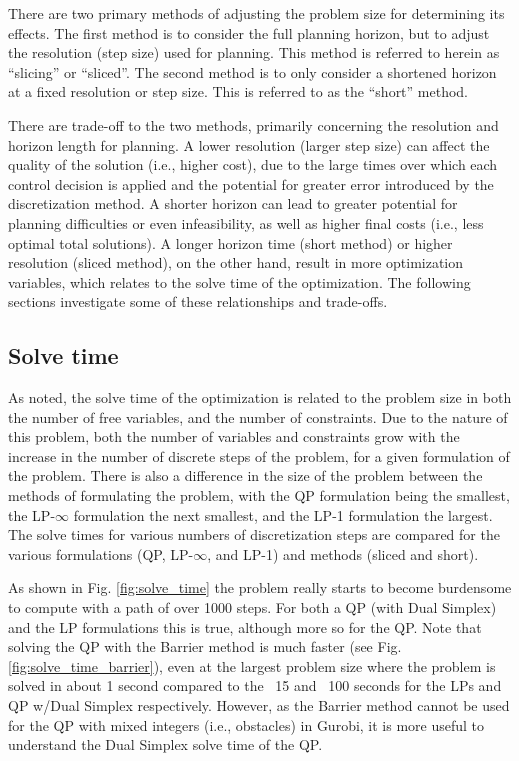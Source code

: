 There are two primary methods of adjusting the problem size for determining its effects. The first method is to consider the full planning horizon, but to adjust the resolution (step size) used for planning. This method is referred to herein as ``slicing'' or ``sliced''. The second method is to only consider a shortened horizon at a fixed resolution or step size. This is referred to as the ``short'' method.

There are trade-off to the two methods, primarily concerning the resolution and horizon length for planning. A lower resolution (larger step size) can affect the quality of the solution (i.e., higher cost), due to the large times over which each control decision is applied and the potential for greater error introduced by the discretization method. A shorter horizon can lead to greater potential for planning difficulties or even infeasibility, as well as higher final costs (i.e., less optimal total solutions). A longer horizon time (short method) or higher resolution (sliced method), on the other hand, result in more optimization variables, which relates to the solve time of the optimization. The following sections investigate some of these relationships and trade-offs.

\subsection{Solve time} \label{ssec:solve_time}
As noted, the solve time of the optimization is related to the problem size in both the number of free variables, and the number of constraints. Due to the nature of this problem, both the number of variables and constraints grow with the increase in the number of discrete steps of the problem, for a given formulation of the problem. There is also a difference in the size of the problem between the methods of formulating the problem, with the QP formulation being the smallest, the LP-$\infty$ formulation the next smallest, and the LP-1 formulation the largest. The solve times for various numbers of discretization steps are compared for the various formulations (QP, LP-$\infty$, and LP-1) and methods (sliced and short).

As shown in Fig. \ref{fig:solve_time} the problem really starts to become burdensome to compute with a path of over 1000 steps. For both a QP (with Dual Simplex) and the LP formulations this is true, although more so for the QP. Note that solving the QP with the Barrier method is much faster (see Fig. \ref{fig:solve_time_barrier}), even at the largest problem size where the problem is solved in about 1 second compared to the ~15 and ~100 seconds for the LPs and QP w/Dual Simplex respectively. However, as the Barrier method cannot be used for the QP with mixed integers (i.e., obstacles) in Gurobi, it is more useful to understand the Dual Simplex solve time of the QP.

